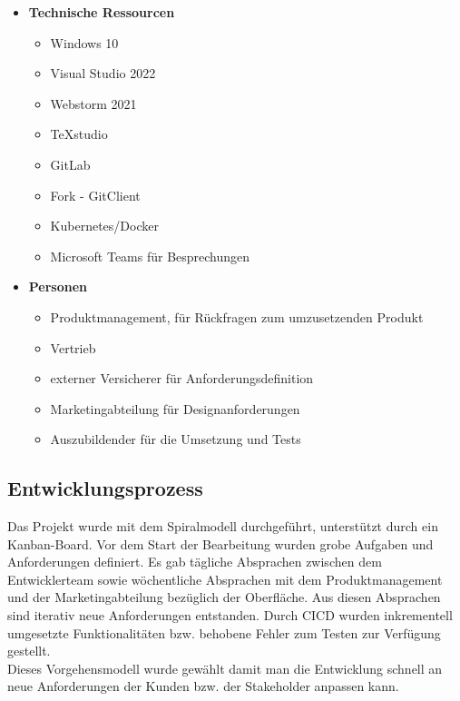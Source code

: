 \begin{itemize}
	\item \textbf{Technische Ressourcen}
	\begin{itemize}
		\item Windows 10
		\item Visual Studio 2022
		\item Webstorm 2021
		\item TeXstudio
		\item GitLab
		\item Fork - GitClient
		\item Kubernetes/Docker
		\item Microsoft Teams für Besprechungen
	\end{itemize}
	\item \textbf{Personen}
	\begin{itemize}
	 	\item Produktmanagement, für Rückfragen zum umzusetzenden Produkt
	 	\item Vertrieb
	 	\item externer Versicherer für Anforderungsdefinition
		\item Marketingabteilung für Designanforderungen
		\item Auszubildender für die Umsetzung und Tests
	\end{itemize}
\end{itemize}

\subsection{Entwicklungsprozess}
\label{entwicklungsprozess}
Das Projekt wurde mit dem Spiralmodell durchgeführt, unterstützt durch ein Kanban-Board. Vor dem Start der Bearbeitung wurden grobe Aufgaben und Anforderungen definiert. Es gab tägliche Absprachen zwischen dem Entwicklerteam sowie wöchentliche Absprachen mit dem Produktmanagement und der Marketingabteilung bezüglich der Oberfläche. Aus diesen Absprachen sind iterativ neue Anforderungen entstanden. Durch \ac{CICD} wurden inkrementell umgesetzte Funktionalitäten bzw. behobene Fehler zum Testen zur Verfügung gestellt. \\
Dieses Vorgehensmodell wurde gewählt damit man die Entwicklung schnell an neue Anforderungen der Kunden bzw. der Stakeholder anpassen kann.